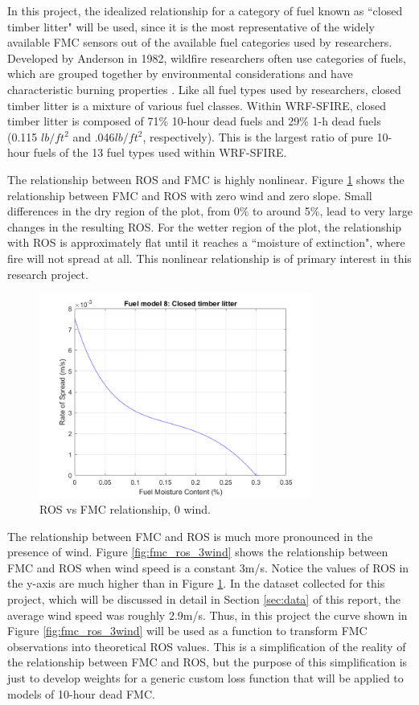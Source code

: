 \documentclass[11pt]{article}%
\begin{document}
In this project, the idealized relationship for a category of fuel known as ``closed timber litter" will be used, since it is the most representative of the widely available FMC sensors out of the available fuel categories used by researchers. Developed by Anderson in 1982, wildfire researchers often use categories of fuels, which are grouped together by environmental considerations and have characteristic burning properties \citep{NIFC-2024-FAF}. Like all fuel types used by researchers, closed timber litter is a mixture of various fuel classes. Within WRF-SFIRE, closed timber litter is composed of 71\% 10-hour dead fuels and 29\% 1-h dead fuels (0.115 $lb/ft^2$ and .046$lb/ft^2$, respectively). This is the largest ratio of pure 10-hour fuels of the 13 fuel types used within WRF-SFIRE.

The relationship between ROS and FMC is highly nonlinear. Figure \ref{fig:fmc_ros_0wind} shows the relationship between FMC and ROS with zero wind and zero slope. Small differences in the dry region of the plot, from 0\% to around 5\%, lead to very large changes in the resulting ROS. For the wetter region of the plot, the relationship with ROS is approximately flat until it reaches a ``moisture of extinction", where fire will not spread at all. This nonlinear relationship is of primary interest in this research project. 

\begin{figure}[p]
    \centering
    \includegraphics[width=0.8\textwidth]{images/fuel8_ros_fm_0wind.png}
    \caption{ROS vs FMC relationship, 0 wind.}
    \label{fig:fmc_ros_0wind}
\end{figure}

The relationship between FMC and ROS is much more pronounced in the presence of wind. Figure \ref{fig:fmc_ros_3wind} shows the relationship between FMC and ROS when wind speed is a constant 3m/s. Notice the values of ROS in the y-axis are much higher than in Figure \ref{fig:fmc_ros_0wind}. In the dataset collected for this project, which will be discussed in detail in Section \ref{sec:data} of this report, the average wind speed was roughly 2.9m/s. Thus, in this project the curve shown in Figure \ref{fig:fmc_ros_3wind} will be used as a function to transform FMC observations into theoretical ROS values. This is a simplification of the reality of the relationship between FMC and ROS, but the purpose of this simplification is just to develop weights for a generic custom loss function that will be applied to models of 10-hour dead FMC.
\end{document}
